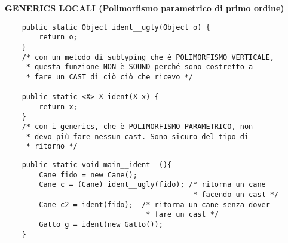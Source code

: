 \noindent \textbf{GENERICS LOCALI (Polimorfismo parametrico di primo ordine)} 

\begin{lstlisting}
    public static Object ident__ugly(Object o) {
        return o;
    }   
    /* con un metodo di subtyping che è POLIMORFISMO VERTICALE, 
     * questa funzione NON è SOUND perché sono costretto a 
     * fare un CAST di ciò ciò che ricevo */

    public static <X> X ident(X x) {
        return x;
    }   
    /* con i generics, che è POLIMORFISMO PARAMETRICO, non
     * devo più fare nessun cast. Sono sicuro del tipo di
     * ritorno */
\end{lstlisting}

\begin{lstlisting}
	public static void main__ident	(){
		Cane fido = new Cane();
		Cane c = (Cane) ident__ugly(fido); /* ritorna un cane 
											* facendo un cast */
		Cane c2 = ident(fido);  /* ritorna un cane senza dover 
								 * fare un cast */ 
		Gatto g = ident(new Gatto());
	}
\end{lstlisting}





















